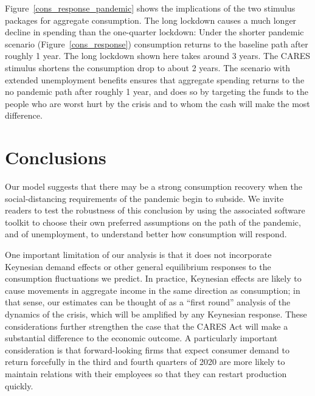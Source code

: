 Figure~\ref{cons_response_pandemic} shows the implications of the two stimulus packages for aggregate consumption. 
The long lockdown causes a much longer decline in spending than the one-quarter lockdown: Under the shorter pandemic scenario (Figure~\ref{cons_response}) consumption returns to the baseline path after roughly 1 year. The long lockdown shown here takes around 3 years.  
The CARES stimulus shortens the consumption drop to about 2 years.
The scenario with extended unemployment benefits ensures that aggregate spending returns to the no pandemic path after roughly 1 year, and does so by targeting the funds to the people who are worst hurt by the crisis and to whom the cash will make the most difference.  

\section{Conclusions}

Our model suggests that there may be a strong consumption recovery when the social-distancing requirements of the pandemic begin to subside.
We invite readers to test the robustness of this conclusion by using the associated software toolkit to choose their own preferred assumptions on the path of the pandemic, and of unemployment, to understand better how consumption will respond.

One important limitation of our analysis is that it does not incorporate Keynesian demand effects or other general equilibrium responses to the consumption fluctuations we predict.
In practice, Keynesian effects are likely to cause movements in aggregate income in the same direction as consumption; in that sense, our estimates can be thought of as a ``first round'' analysis of the dynamics of the crisis, which will be amplified by any Keynesian response.
These considerations further strengthen the case that the CARES Act will make a substantial difference to the economic outcome.
A particularly important consideration is that forward-looking firms that expect consumer demand to return forcefully in the third and fourth quarters of 2020 are more likely to maintain relations with their employees so that they can restart production quickly.

